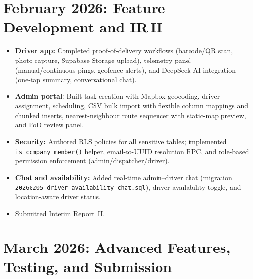\section*{February 2026: Feature Development and IR\,II}

\begin{itemize}
  \item \textbf{Driver app:} Completed proof-of-delivery workflows (barcode/QR scan,
        photo capture, Supabase Storage upload), telemetry panel (manual/continuous pings,
        geofence alerts), and DeepSeek AI integration (one-tap summary, conversational chat).
  \item \textbf{Admin portal:} Built task creation with Mapbox geocoding, driver assignment,
        scheduling, CSV bulk import with flexible column mappings and chunked inserts,
        nearest-neighbour route sequencer with static-map preview, and PoD review panel.
  \item \textbf{Security:} Authored RLS policies for all sensitive tables; implemented
        \texttt{is\_company\_member()} helper, email-to-UUID resolution RPC, and
        role-based permission enforcement (admin/dispatcher/driver).
  \item \textbf{Chat and availability:} Added real-time admin--driver chat
        (migration \texttt{20260205\_driver\_availability\_\allowbreak chat.sql}), driver availability
        toggle, and location-aware driver status.
  \item Submitted Interim Report~II.
\end{itemize}

\section*{March 2026: Advanced Features, Testing, and Submission}

